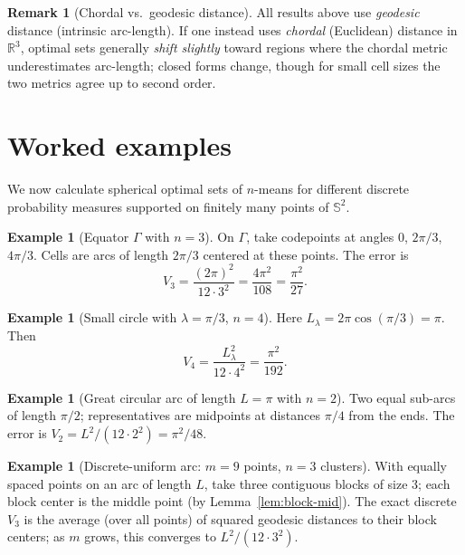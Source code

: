 \documentclass[12pt, reqno]{amsart}
\theoremstyle{plain}
\theoremstyle{definition}
\newtheorem{exam}[subsection]{Example}
\newtheorem{remark1}[subsubsection]{Remark}
\newcommand{\gG}{\Gamma}
\newcommand{\D}[1]{\mathbb{#1}}%
\begin{document}
\begin{remark1}[Chordal vs.\ geodesic distance]
All results above use \emph{geodesic} distance (intrinsic arc-length). If one instead uses \emph{chordal} (Euclidean) distance in $\D R^3$, optimal sets generally \emph{shift slightly} toward regions where the chordal metric underestimates arc-length; closed forms change, though for small cell sizes the two metrics agree up to second order.
\end{remark1}

\section{Worked examples}
We now calculate spherical optimal sets of $n$-means for different discrete probability measures supported on finitely many points of $\D S^2$.

\begin{exam}[Equator $\gG$ with $n=3$]
On $\Gamma$, take codepoints at angles $0$, $2\pi/3$, $4\pi/3$. Cells are arcs of length $2\pi/3$ centered at these points. The error is
\[
V_3=\frac{(2\pi)^2}{12\cdot 3^2}=\frac{4\pi^2}{108}=\frac{\pi^2}{27}.
\]
\end{exam}

\begin{exam}[Small circle with $\lambda=\pi/3$, $n=4$]
Here $L_\lambda=2\pi\cos(\pi/3)=\pi$. Then
\[
V_4=\frac{L_\lambda^2}{12\cdot 4^2}=\frac{\pi^2}{192}.
\]
\end{exam}

\begin{exam}[Great circular arc of length $L=\pi$ with $n=2$]
Two equal sub-arcs of length $\pi/2$; representatives are midpoints at distances $\pi/4$ from the ends. The error is $V_2=L^2/(12\cdot 2^2)=\pi^2/48$.
\end{exam}

\begin{exam}[Discrete-uniform arc: $m=9$ points, $n=3$ clusters]
With equally spaced points on an arc of length $L$, take three contiguous blocks of size $3$; each block center is the middle point (by Lemma~\ref{lem:block-mid}). The exact discrete $V_3$ is the average (over all points) of squared geodesic distances to their block centers; as $m$ grows, this converges to $L^2/(12\cdot 3^2)$.
\end{exam}
\end{document}

